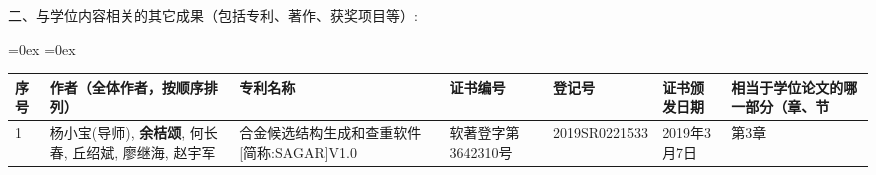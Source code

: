 \documentclass[phd,nobackinfo]{scutthesis}
\begin{document}
\begin{resume}
\vspace{2mm}

\noindent 二、与学位内容相关的其它成果（包括专利、著作、获奖项目等）:

\begin{adjustbox}{center}
  \aboverulesep=0ex
  \belowrulesep=0ex
  \renewcommand{\arraystretch}{1.1}
    \centering
    \begin{tabular}{|p{2mm}|p{36mm}|p{36mm}|p{24mm}|p{30mm}|p{16mm}|p{16mm}|}
      \toprule
      \textbf{序号} & \textbf{作者（全体作者，按顺序排列）} & \textbf{专利名称} & \textbf{证书编号} & \textbf{登记号} & \textbf{证书颁发日期} & \textbf{相当于学位论文的哪一部分（章、节} \\
      \midrule
        1 & 杨小宝(导师), {\textbf{余桔颂}}, 何长春, 丘绍斌, 廖继海, 赵宇军 & 合金候选结构生成和查重软件[简称:SAGAR]V1.0 & 软著登字第3642310号 & 2019SR0221533 & 2019年3月7日 & 第3章 \\
      \bottomrule
    \end{tabular}
\end{adjustbox}

\end{resume}
\end{document}
